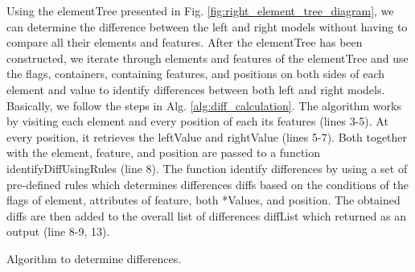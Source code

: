 \documentclass{jot}
\begin{document}
Using the \textsf{elementTree} presented in Fig. \ref{fig:right_element_tree_diagram}, we can determine the difference between the left and right models without having to compare all their elements and features. After the \textsf{elementTree} has been constructed, we iterate through elements and features of the \textsf{elementTree} and use the flags, containers, containing features, and positions on both sides of each element and value to identify differences between both left and right models. Basically, we follow the steps in Alg. \ref{alg:diff_calculation}. The algorithm works by visiting each element and every position of each its features (lines 3-5). At every position, it retrieves the \textsf{leftValue} and \textsf{rightValue} (lines 5-7).  Both together with the \textsf{element}, \textsf{feature}, and \textsf{position} are passed to a function \textsf{identifyDiffUsingRules} (line 8). The function identify differences by using a set of pre-defined rules which determines differences \textsf{diffs} based on the conditions of the flags of \textsf{element}, attributes of \textsf{feature}, both \textsf{*Values}, and \textsf{position}. The obtained \textsf{diffs} are then added to the overall list of differences \textsf{diffList} which returned as an output (line 8-9, 13). 

\IncMargin{1.5em}
\begin{algorithm}[H]
    \begin{footnotesize}
    \end{footnotesize}
    \caption{Algorithm to determine differences.}
    \label{alg:diff_calculation}
\end{algorithm}
\DecMargin{1.5em}
\end{document}
